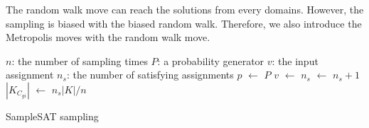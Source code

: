 The random walk move can reach the solutions from every domains.
However, the sampling is biased with the biased random walk. Therefore,
we also introduce the Metropolis moves with the random walk move.

\IncMargin{1em}
\begin{algorithm}
\SetAlgoLined
\DontPrintSemicolon


$n$: the number of sampling times \;
$P$: a probability generator \;
$v$: the input assignment \;
$n_{s}$: the number of satisfying assignments \;
 {
      $p$ $\leftarrow$ $P$ \;
      {
        $v$ $\leftarrow$  {}
      }
      {$n_{s}$ $\leftarrow$ $n_{s} + 1$}
}
$|K_{C_{gi}}|$ $\leftarrow$ $n_s|K| / n$
\caption{SampleSAT sampling}
\end{algorithm}
\DecMargin{1em}